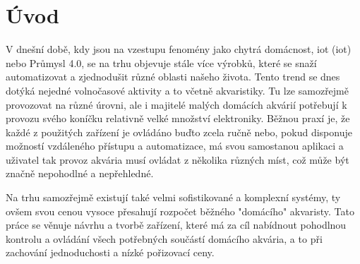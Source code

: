 \chapter*{Úvod}
{}


V dnešní době, kdy jsou na vzestupu fenomény jako chytrá domácnost, \acs{iot} (\acl{iot}) nebo Průmysl 4.0, se na trhu objevuje stále více výrobků, které se snaží automatizovat a zjednodušit různé oblasti našeho života. Tento trend se dnes dotýká nejedné volnočasové aktivity a to včetně akvaristiky. Tu lze samozřejmě provozovat na různé úrovni, ale i majitelé malých domácích akvárií potřebují k provozu svého koníčku relativně velké množství elektroniky. 
Běžnou praxí je, že každé z použitých zařízení je ovládáno buďto zcela ručně nebo, pokud disponuje možností vzdáleného přístupu a automatizace, má svou samostanou aplikaci a uživatel tak provoz akvária musí ovládat z několika různých míst, což může být značně nepohodlné a nepřehledné.

Na trhu samozřejmě existují také velmi sofistikované a komplexní systémy, ty ovšem svou cenou vysoce přesahují rozpočet běžného "domácího" akvaristy. Tato práce se věnuje návrhu a tvorbě zařízení, které má za cíl nabídnout pohodlnou kontrolu a ovládání všech potřebných součástí domácího akvária, a to při zachování jednoduchosti a nízké pořizovací ceny.

% 